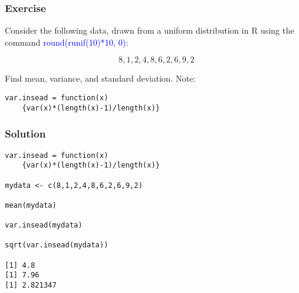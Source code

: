 \documentclass[xcolor=dvipsnames]{beamer} %
\begin{document}
\begin{frame}[fragile]
\frametitle{Exercise}
Consider the following data, drawn from a uniform distribution in \textcolor{dark_red}{\textsf{R}} using the command \textcolor{blue}{round(runif(10)*10, 0)}:

$$ 8,  1,  2,  4,  8,  6,  2,  6,  9, 2 $$

Find mean, variance, and standard deviation. Note:

\begin{verbatim}
var.insead = function(x)
    {var(x)*(length(x)-1)/length(x)}
\end{verbatim}

\end{frame}

\begin{frame}[fragile]
\frametitle{Solution}
\begin{verbatim}
var.insead = function(x)
    {var(x)*(length(x)-1)/length(x)}

mydata <- c(8,1,2,4,8,6,2,6,9,2)

mean(mydata) 

var.insead(mydata) 

sqrt(var.insead(mydata))

[1] 4.8
[1] 7.96
[1] 2.821347
\end{verbatim}
\end{frame}
\end{document}
